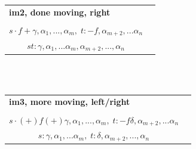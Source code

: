 \documentclass[12pt]{article}
\begin{document}
\begin{landscape}
\noindent\begin{tabular}{cc}
\multicolumn{2}{l}{\textbf{im2, done moving, right}}\\
& \\
$s\cdot f\!+ \gamma, \alpha_1,...,\alpha_m,\; t : -f, \alpha_{m+2},...\alpha_n $ \\
\hline
$st : \gamma,\alpha_1,...\alpha_m,\alpha_{m+2},...,\alpha_n$
\end{tabular} \\ \\

\noindent\begin{tabular}{cc}
\multicolumn{2}{l}{\textbf{im3, more moving, left/right}}\\
& \\
$s\cdot (+)\!f\!(+) \gamma, \alpha_1,...,\alpha_m,\; t : -f\delta, \alpha_{m+2},...\alpha_n $ \\
\hline
$s : \gamma,\alpha_1,...\alpha_m,\; t : \delta,\alpha_{m+2},...,\alpha_n$
\end{tabular} \\ \\

\end{landscape}
\end{document}
